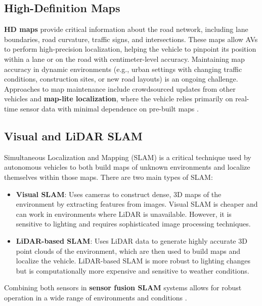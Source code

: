 \documentclass[12pt,a4paper]{article}
\begin{document}
\subsection{High-Definition Maps}
\textbf{HD maps} provide critical information about the road network, including lane boundaries, road curvature, traffic signs, and intersections. These maps allow AVs to perform high-precision localization, helping the vehicle to pinpoint its position within a lane or on the road with centimeter-level accuracy. Maintaining map accuracy in dynamic environments (e.g., urban settings with changing traffic conditions, construction sites, or new road layouts) is an ongoing challenge. Approaches to map maintenance include crowdsourced updates from other vehicles and \textbf{map-lite localization}, where the vehicle relies primarily on real-time sensor data with minimal dependence on pre-built maps \cite{he2019overview}.

\subsection{Visual and LiDAR SLAM}
Simultaneous Localization and Mapping (SLAM) is a critical technique used by autonomous vehicles to both build maps of unknown environments and localize themselves within those maps. There are two main types of SLAM:
\begin{itemize}
    \item \textbf{Visual SLAM}: Uses cameras to construct dense, 3D maps of the environment by extracting features from images. Visual SLAM is cheaper and can work in environments where LiDAR is unavailable. However, it is sensitive to lighting and requires sophisticated image processing techniques.
    \item \textbf{LiDAR-based SLAM}: Uses LiDAR data to generate highly accurate 3D point clouds of the environment, which are then used to build maps and localize the vehicle. LiDAR-based SLAM is more robust to lighting changes but is computationally more expensive and sensitive to weather conditions.
\end{itemize}

Combining both sensors in \textbf{sensor fusion SLAM} systems allows for robust operation in a wide range of environments and conditions \cite{cadena2016past, zhou2018vehicle}.
\end{document}
